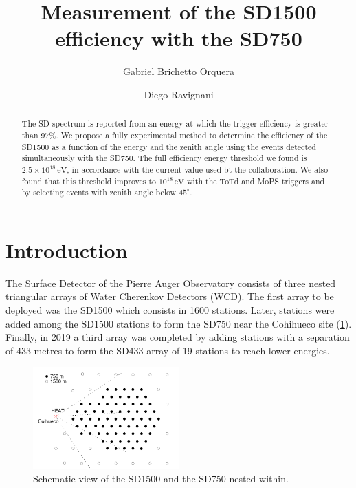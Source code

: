 \documentclass[12pt,a4paper]{article}
\newcommand{\eV}{\, \mathrm{eV}}
\begin{document}

\title{\textbf{Measurement of the SD1500 efficiency with the SD750}}



\author{Gabriel Brichetto Orquera}
\author{Diego Ravignani}

\date{\vspace{-2 cm}} %

\maketitle

\vspace{2 pt}
\begin{abstract}
The SD spectrum is reported from an energy at which the trigger efficiency is greater than $97\%$.
We propose a fully experimental method to determine the efficiency of the SD1500 as a function of the energy and the zenith angle using the events detected simultaneously with the SD750. The full efficiency energy threshold we found is $2.5\times10^{18}\eV$, in accordance with the current value used bt the collaboration. We also found that this threshold improves to $10^{18}\eV$ with the ToTd and MoPS triggers and by selecting events with zenith angle below $45^{\circ}$.
\end{abstract}


\section{Introduction}

The Surface Detector of the Pierre Auger Observatory consists of three nested triangular arrays of Water Cherenkov Detectors (WCD). The first array to be deployed was the SD1500 which consists in 1600 stations. Later, stations were added among the SD1500 stations to form the SD750 near the Cohihueco site (\cref{fig:SD}). Finally, in 2019 a third array was completed by adding stations with a separation of 433 metres to form the SD433 array of 19 stations to reach lower energies. 

\begin{figure}[]
    \begin{center}
        \includegraphics[width=0.5\textwidth]{plots/SD.pdf}  
        \caption{Schematic view of the SD1500 and the SD750 nested within.
        \label{fig:SD}}
        \vspace{-0.5cm}
    \end{center}
\end{figure} 
\end{document}
